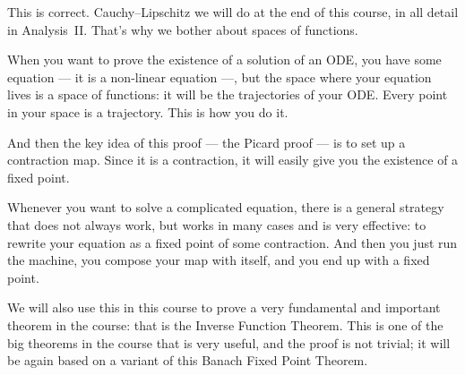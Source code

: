 \begin{speech}[00:42:14 - 00:44:24]
This is correct. Cauchy--Lipschitz we will do at the end of this course, in all detail in Analysis~II. That's why we bother about spaces of functions.

When you want to prove the existence of a solution of an ODE, you have some equation --- it is a non-linear equation ---, but the space where your equation lives is a space of functions: it will be the trajectories of your ODE. Every point in your space is a trajectory. This is how you do it.

And then the key idea of this proof --- the Picard proof --- is to set up a contraction map. Since it is a contraction, it will easily give you the existence of a fixed point.

Whenever you want to solve a complicated equation, there is a general strategy that does not always work, but works in many cases and is very effective: to rewrite your equation as a fixed point of some contraction. And then you just run the machine, you compose your map with itself, and you end up with a fixed point. 

We will also use this in this course to prove a very fundamental and important theorem in the course: that is the Inverse Function Theorem. This is one of the big theorems in the course that is very useful, and the proof is not trivial; it will be again based on a variant of this Banach Fixed Point Theorem.
\end{speech}

